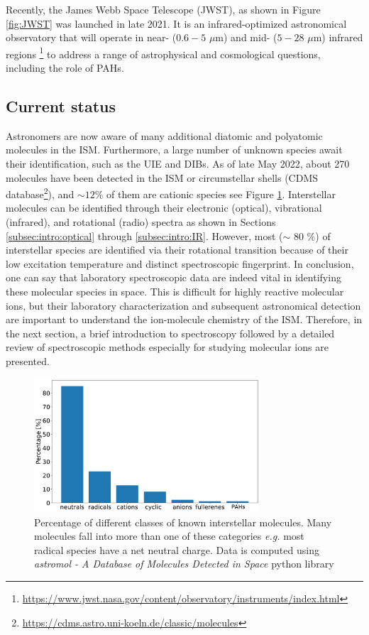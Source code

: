 Recently, the James Webb Space Telescope (JWST), as shown in Figure \ref{fig:JWST} was launched in late 2021. It is an infrared-optimized astronomical observatory that will operate in near- ($0.6 - 5$ $\mu$m) and mid- ($5 - 28$ $\mu$m) infrared regions \footnote{\url{https://www.jwst.nasa.gov/content/observatory/instruments/index.html}} to address a range of astrophysical and cosmological questions, including the role of PAHs.

\subsection{Current status}
Astronomers are now aware of many additional diatomic and polyatomic molecules in the ISM. Furthermore, a large number of unknown species await their identification, such as the UIE and DIBs. As of late May 2022, about 270 molecules have been detected in the ISM or circumstellar shells (CDMS database\footnote{\url{https://cdms.astro.uni-koeln.de/classic/molecules}}), and $\sim 12 \%$ of them are cationic species \cite{mcguire_2021_2021} see Figure \ref{fig:ISM_molecules}. Interstellar molecules can be identified through their electronic (optical), vibrational (infrared), and rotational (radio) spectra as shown in Sections \ref{subsec:intro:optical} through \ref{subsec:intro:IR}. However, most ($\sim$ 80 \%) of interstellar species are identified via their rotational transition \cite{mcguire_2021_2021} because of their low excitation temperature and distinct spectroscopic  fingerprint. In conclusion, one can say that laboratory spectroscopic data are indeed vital in identifying these molecular species in space. This is difficult for highly reactive molecular ions, but their laboratory characterization and subsequent astronomical detection are important to understand the ion-molecule chemistry of the ISM. Therefore, in the next section, a brief introduction to spectroscopy followed by a detailed review of spectroscopic methods especially for studying molecular ions are presented.

\begin{figure}[!htb]
    \centering
    \includegraphics[width=0.75\textwidth]{figures/intro/known_molecules_in_space.pdf}
    \caption{Percentage of different classes of  known interstellar molecules. Many molecules fall into more than one of these categories \emph{e.g.} most radical species have a net neutral charge. Data is computed using \emph{astromol - A Database of Molecules Detected in Space} python library \cite{mcguire_astromol_2021}}
    \label{fig:ISM_molecules}
\end{figure}
